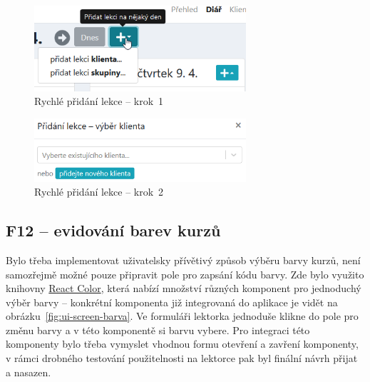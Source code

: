 \begin{figure}[h]\centering
    \includegraphics[width=0.7\textwidth]{img/ui-screen-efektivita-lekce1.png}
    \caption{Rychlé přidání lekce -- krok~1}\label{fig:ui-screen-efektivita-lekce1}
\end{figure}

\begin{figure}[h]\centering
    \includegraphics[width=0.7\textwidth]{img/ui-screen-efektivita-lekce2.png}
    \caption{Rychlé přidání lekce -- krok~2}\label{fig:ui-screen-efektivita-lekce2}
\end{figure}

\subsection{F12 -- evidování barev kurzů}

Bylo třeba implementovat uživatelsky přívětivý způsob výběru barvy kurzů, není samozřejmě možné pouze připravit pole pro zapsání kódu barvy. Zde bylo využito knihovny \href{https://github.com/casesandberg/react-color/}{React Color}, která nabízí množství různých komponent pro jednoduchý výběr barvy -- konkrétní komponenta již integrovaná do aplikace je vidět na obrázku~\ref{fig:ui-screen-barva}. Ve formuláři lektorka jednoduše klikne do pole pro změnu barvy a v této komponentě si barvu vybere. Pro integraci této komponenty bylo třeba vymyslet vhodnou formu otevření a zavření komponenty, v rámci drobného testování použitelnosti na lektorce pak byl finální návrh přijat a nasazen.

